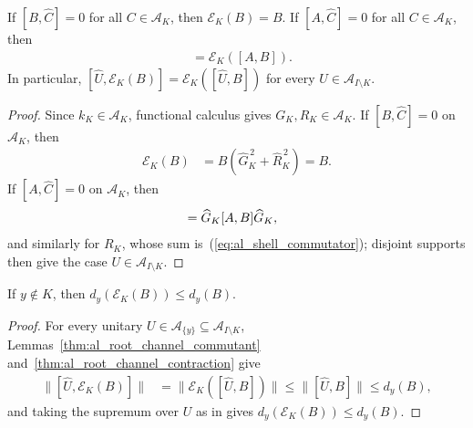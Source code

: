 \begin{lemma}
    \label{thm:al_root_channel_commutant}
    \leanok
    If $[B,\widehat C]=0$ for all $C\in\mathcal A_K$, then
    $\mathcal E_K(B)=B$. If $[A,\widehat C]=0$ for all $C\in\mathcal A_K$,
    then
    \begin{align}
        [A,\mathcal E_K(B)] & =\mathcal E_K([A,B]).
        \label{eq:al_shell_commutator}
    \end{align}
    In particular, $[\widehat U,\mathcal E_K(B)]=\mathcal E_K([\widehat U,B])$
    for every $U\in\mathcal A_{I\setminus K}$.
\end{lemma}
\begin{proof}
    \leanok
    Since $k_K\in\mathcal A_K$, functional calculus gives
    $G_K,R_K\in\mathcal A_K$. If $[B,\widehat C]=0$ on $\mathcal A_K$, then
    \begin{align}
        \mathcal E_K(B)
         & =B(\widehat G_K^{\,2}+\widehat R_K^{\,2})=B.
        \label{eq:al_shell_commutant_fixed}
    \end{align}
    If $[A,\widehat C]=0$ on $\mathcal A_K$, then
    \begin{align}
        [A,\widehat G_K B\widehat G_K]
         & =\widehat G_K[A,B]\widehat G_K, \notag
    \end{align}
    and similarly for $R_K$, whose sum is~(\ref{eq:al_shell_commutator});
    disjoint supports then give the case $U\in\mathcal A_{I\setminus K}$.
\end{proof}

\begin{lemma}
    \label{thm:al_root_channel_outside_oscillation}
    \leanok
    If $y\notin K$, then $d_y(\mathcal E_K(B))\le d_y(B)$.
\end{lemma}
\begin{proof}
    \leanok
    For every unitary $U\in\mathcal A_{\{y\}}\subseteq\mathcal A_{I\setminus K}$,
    Lemmas~\ref{thm:al_root_channel_commutant}
    and~\ref{thm:al_root_channel_contraction} give
    \begin{align}
        \|[\widehat U,\mathcal E_K(B)]\|
         & =\|\mathcal E_K([\widehat U,B])\|
        \le\|[\widehat U,B]\|\le d_y(B),
        \label{eq:al_shell_outside_commutator}
    \end{align}
    and taking the supremum over $U$ as in
    \cite[Section~10]{OpenAI2026AreaLaw} gives
    $d_y(\mathcal E_K(B))\le d_y(B)$.
\end{proof}


